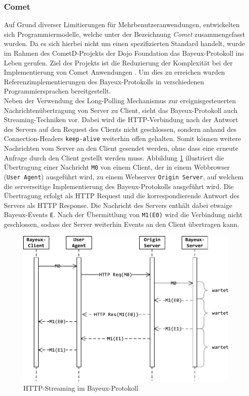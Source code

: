 \documentclass[11pt,a4paper,titlepage]{scrartcl}
\numberwithin{equation}{section}
\begin{document}
\subsubsection{Comet}\label{subsubsec:Comet}
Auf Grund diverser Limitierungen für Mehrbenutzeranwendungen, entwickelten sich Programmiermodelle, welche unter der Bezeichnung \textit{Comet} \autocite{russell_comet_2006} zusammengefasst wurden. Da es sich hierbei nicht um einen spezifizierten Standard handelt, wurde im Rahmen des CometD-Projekts der Dojo Foundation das Bayeux-Protokoll ins Leben gerufen. Ziel des Projekts ist die Reduzierung der Komplexität bei der Implementierung von Comet Anwendungen \autocite{russell_cometd_2007}. Um dies zu erreichen wurden Referenzimplementierungen des Bayeux-Protokolls in verschiedenen Programmiersprachen bereitgestellt. \\

\noindent Neben der Verwendung des Long-Polling Mechanismus zur ereignisgesteuerten Nachrichtenübertragung von Server zu Client, sieht das Bayeux-Protokoll auch Streaming-Techniken vor. Dabei wird die HTTP-Verbindung nach der Antwort des Servers auf den Request des Clients nicht geschlossen, sondern anhand des Connection-Headers \texttt{keep-alive} weiterhin offen gehalten. Somit können weitere Nachrichten vom Server an den Client gesendet werden, ohne dass eine erneute Anfrage durch den Client gestellt werden muss. Abbildung \ref{fig:wsBayeuxStream} illustriert die Übertragung einer Nachricht \texttt{M0} von einem Client, der in einem Webbrowser (\texttt{User Agent}) ausgeführt wird, zu einem Webserver \texttt{Origin Server}, auf welchem die serverseitige Implementierung des Bayeux-Protokolls ausgeführt wird. Die Übertragung erfolgt als HTTP Request und die korrespondierende Antwort des Servers als HTTP Response. Die Nachricht des Servers enthält dabei etwaige Bayeux-Events \texttt{E}. Nach der Übermittlung von \texttt{M1(E0)} wird die Verbindung nicht geschlossen, sodass der Server weiterhin Events an den Client übertragen kann. 

\begin{figure}[ht] 
	\begin{center}
		\includegraphics[scale=1]{img/bayeuxstream.pdf}
		\caption{HTTP-Streaming im Bayeux-Protokoll}
		\label{fig:wsBayeuxStream}
	\end{center}
\end{figure}
\end{document}
